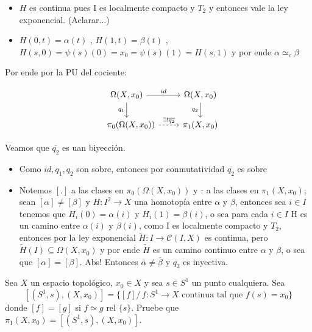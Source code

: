 \documentclass[11pt]{article}
\newenvironment{proof}[1][Demostraci\'on]{\begin{trivlist}
\item[\hskip \labelsep {\bfseries #1}]}{\end{trivlist}}
\newcommand{\CC}{\mathcal{C}}
\begin{document}
\begin{enumerate}
\begin{proof}
\begin{itemize}
\begin{itemize}
\item $H$ es continua pues I es localmente compacto y $T_2$ y entonces vale la ley exponencial. (Aclarar...)
\item $H(0,t)=\alpha(t)$ , $H(1,t)=\beta(t)$ , $H(s,0)=\psi(s)(0)=x_0=\psi(s)(1)=H(s,1)$ y por ende $\alpha \simeq_c \beta$
\end{itemize}

Por ende por la PU del cociente:


\[
\begin{tikzcd}
\Omega(X,x_0) \arrow{r}{id} \arrow[swap]{d}{q_1} & \Omega(X,x_0) \arrow[swap]{d}{q_2}\\ \quad 
\pi_0(\Omega(X,x_0)) \arrow[dashed]{r}{\exists!\overline{q_2}} & \pi_1(X,x_0)  
\end{tikzcd}
\]

Veamos que $\overline{q_2}$ es uan biyecci\'on.

\begin{itemize}
\item Como $id,q_1,q_2$ son sobre, entonces por conmutatividad $\overline{q_2}$ es sobre
\item Notemos $[.]$ a las clases en $\pi_0(\Omega(X,x_0))$ y $\overline{.}$ a las clases en $\pi_1(X,x_0)$; sean $[\alpha] \neq [\beta]$ y $H:I^2 \rightarrow X$ una homotop\'ia entre $\alpha$ y $\beta$, entonces sea $i \in I$ tenemos que $H_i(0)=\alpha(i)$ y $H_i(1)=\beta(i)$, o sea para cada $i \in I$ H es un camino entre $\alpha(i)$ y $\beta(i)$, como I es localmente compacto y $T_2$, entonces por la ley exponencial $\tilde{H}:I \rightarrow \CC(I,X)$ es continua, pero $\tilde{H}(I) \subseteq \Omega(X,x_0)$ y por ende $\tilde{H}$ es un camino continuo entre $\alpha$ y $\beta$, o sea que $[\alpha]=[\beta]$. Abs! Entonces $\overline{\alpha}\neq \overline{\beta}$ y $\overline{q_2}$ es inyectiva.

\end{itemize}

\end{itemize}

\end{proof}


\item Sea $X$ un espacio topol\'ogico, $x_0\in X$ y sea $s\in S^1$ un punto cualquiera. Sea
$$[(S^1,s),(X,x_0)]=\{[f] /\,  f:S^1\to X  \text{ continua tal que } f(s)=x_0\}$$
donde $[f]=[g]$ si $f\simeq g \textrm{ rel } \{s\} $. Pruebe que $\pi_1(X,x_0)=[(S^1,s),(X,x_0)]$.


\end{enumerate}
\end{document}
